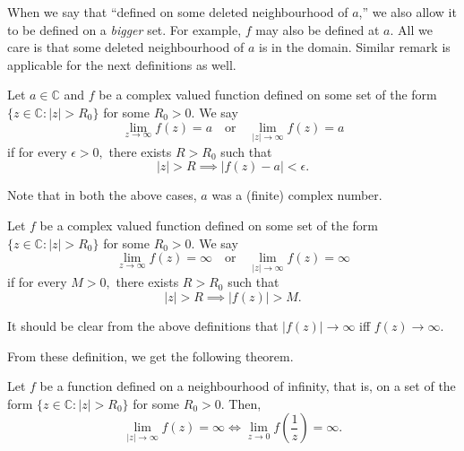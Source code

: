\documentclass[12pt]{article}
\theoremstyle{definition}
\begin{document}
\begin{enumerate}[leftmargin=*]
    When we say that ``defined on some deleted neighbourhood of $a$,'' we also allow it to be defined on a \emph{bigger} set. For example, $f$ may also be defined at $a.$ All we care is that some deleted neighbourhood of $a$ is in the domain. Similar remark is applicable for the next definitions as well.

    \begin{defn}
    	Let $a \in \mathbb{C}$ and $f$ be a complex valued function defined on some set of the form $\{z \in \mathbb{C} : |z| > R_0\}$ for some $R_0 > 0.$ We say 
    	\begin{equation*} 
    		\lim_{z\to \infty}f(z) = a \quad\text{or}\quad \lim_{|z|\to \infty}f(z) = a
    	\end{equation*}
    	if for every $\epsilon > 0,$ there exists $R > R_0$ such that
    	\begin{equation*} 
    		|z| > R \implies |f(z) - a| < \epsilon.
    	\end{equation*}
    \end{defn}
    
    {\color{red}Note that in both the above cases, $a$ was a (finite) complex number.}

    \begin{defn}
    	Let $f$ be a complex valued function defined on some set of the form $\{z \in \mathbb{C} : |z| > R_0\}$ for some $R_0 > 0.$ We say 
    	\begin{equation*} 
    		\lim_{z\to \infty}f(z) = \infty \quad\text{or}\quad \lim_{|z|\to \infty}f(z) = \infty
    	\end{equation*}
    	if for every $M > 0,$ there exists $R > R_0$ such that
    	\begin{equation*} 
    		|z| > R \implies |f(z)| > M.
    	\end{equation*}
    \end{defn}
    It should be clear from the above definitions that $|f(z)| \to \infty$ iff $f(z) \to \infty.$

    From these definition, we get the following theorem.

    \begin{thm}[]
    	Let $f$ be a function defined on a neighbourhood of infinity, that is, on a set of the form $\{z \in \mathbb{C} : |z| > R_0\}$ for some $R_0 > 0.$ Then, 
    	\begin{equation*} 
    		\lim_{|z|\to \infty}f(z) = \infty \iff \lim_{z\to 0}f\left(\dfrac{1}{z}\right) = \infty.
    	\end{equation*}
    \end{thm}


\end{enumerate}
\end{document}
